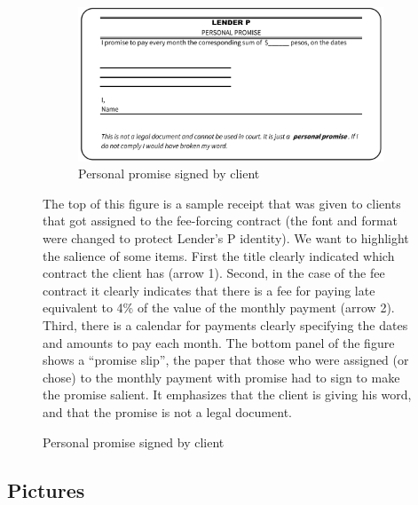 \documentclass[oneside,11pt]{article}
\begin{document}
\begin{figure}[H]
\begin{center}
    \vspace{3ex}
    \begin{subfigure}{0.65\textwidth}
    \caption{Personal promise signed by client}
        \centering
        \includegraphics[width=\textwidth]{Figuras/Personal Promise2.png}
    \end{subfigure}
    \end{center}
    \scriptsize
        The top of this figure is a sample receipt that was given to clients that got assigned to the fee-forcing contract (the font and format were changed to protect Lender's P identity). We want to highlight the salience of some items. First the title clearly indicated which contract the client has (arrow 1). Second, in the case of the fee contract it clearly indicates that there is a fee for paying late equivalent to 4\% of the value of the monthly payment (arrow 2). Third, there is a calendar for payments clearly specifying the dates and amounts to pay each month. The bottom panel of the figure shows a ``promise slip'', the paper that those who were assigned (or chose) to the monthly payment with promise had to sign to make the promise salient. It emphasizes that the client is giving his word, and that the promise is not a legal document.
\end{figure}



\subsection{Pictures}
\end{document}
